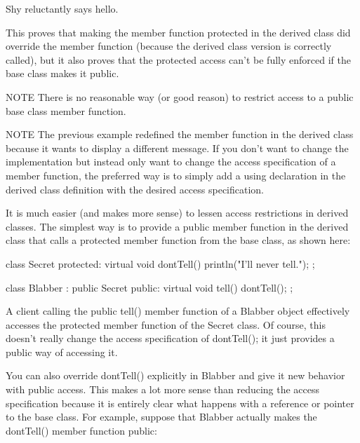 \begin{shell}
Shy reluctantly says hello.
\end{shell}

This proves that making the member function protected in the derived class did override the member function (because the derived class version is correctly called), but it also proves that the protected access can’t be fully enforced if the base class makes it public.

\begin{myNotic}{NOTE}
There is no reasonable way (or good reason) to restrict access to a public base class member function.
\end{myNotic}

\begin{myNotic}{NOTE}
The previous example redefined the member function in the derived class because it wants to display a different message. If you don’t want to change the implementation but instead only want to change the access specification of a member function, the preferred way is to simply add a using declaration in the derived class definition with the desired access specification.
\end{myNotic}

It is much easier (and makes more sense) to lessen access restrictions in derived classes. The simplest way is to provide a public member function in the derived class that calls a protected member function from the base class, as shown here:

\begin{cpp}
class Secret
{
    protected:
        virtual void dontTell() { println("I'll never tell."); }
};

class Blabber : public Secret
{
    public:
        virtual void tell() { dontTell(); }
};
\end{cpp}

A client calling the public tell() member function of a Blabber object effectively accesses the protected member function of the Secret class. Of course, this doesn’t really change the access specification of dontTell(); it just provides a public way of accessing it.

You can also override dontTell() explicitly in Blabber and give it new behavior with public access. This makes a lot more sense than reducing the access specification because it is entirely clear what happens with a reference or pointer to the base class. For example, suppose that Blabber actually makes the dontTell() member function public:

